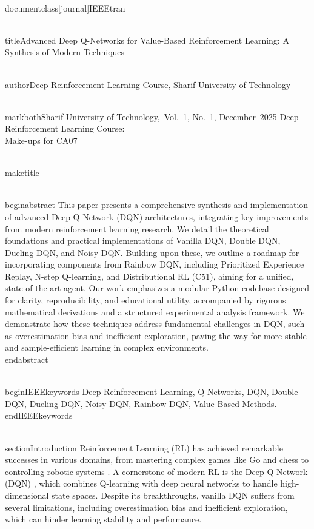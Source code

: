 \\documentclass[journal]{IEEEtran}
\begin{document}
\\title{Advanced Deep Q-Networks for Value-Based Reinforcement Learning: A Synthesis of Modern Techniques}

\\author{Deep Reinforcement Learning Course, Sharif University of Technology}

\\markboth{Sharif University of Technology,~Vol.~1, No.~1, December~2025}%
{Deep Reinforcement Learning Course: \\Make-ups for CA07}

\\maketitle

\\begin{abstract}
This paper presents a comprehensive synthesis and implementation of advanced Deep Q-Network (DQN) architectures, integrating key improvements from modern reinforcement learning research. We detail the theoretical foundations and practical implementations of Vanilla DQN, Double DQN, Dueling DQN, and Noisy DQN. Building upon these, we outline a roadmap for incorporating components from Rainbow DQN, including Prioritized Experience Replay, N-step Q-learning, and Distributional RL (C51), aiming for a unified, state-of-the-art agent. Our work emphasizes a modular Python codebase designed for clarity, reproducibility, and educational utility, accompanied by rigorous mathematical derivations and a structured experimental analysis framework. We demonstrate how these techniques address fundamental challenges in DQN, such as overestimation bias and inefficient exploration, paving the way for more stable and sample-efficient learning in complex environments.
\\end{abstract}

\\begin{IEEEkeywords}
Deep Reinforcement Learning, Q-Networks, DQN, Double DQN, Dueling DQN, Noisy DQN, Rainbow DQN, Value-Based Methods.
\\end{IEEEkeywords}

\\section{Introduction}
Reinforcement Learning (RL) has achieved remarkable successes in various domains, from mastering complex games like Go and chess \cite{silver2016mastering} to controlling robotic systems \cite{levine2016end}. A cornerstone of modern RL is the Deep Q-Network (DQN) \cite{mnih2013playing, mnih2015human}, which combines Q-learning with deep neural networks to handle high-dimensional state spaces. Despite its breakthroughs, vanilla DQN suffers from several limitations, including overestimation bias and inefficient exploration, which can hinder learning stability and performance.
\end{document}
